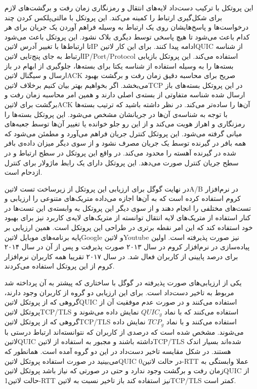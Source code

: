  این پروتکل با ترکیب دست‌داد لایه‌های انتقال و رمزنگاری زمان رفت و برگشت‌های لازم برای شکل‌گیری ارتباط را کمینه می‌کند.
 این پروتکل با مالتی‌پلکس کردن چند درخواست‌ها و پاسخ‌هایشان روی یک ارتباط به وسیله فراهم آوردن یک جریان برای هر کدام باعث می‌شود تا هیچ پاسخی توسط دیگری بلاک نشود.
 این پروتکل باعث می‌شود تا ارتباط‌ها با تغییر آدرس ‌لاتین{IP} ادامه پیدا کنند. برای این کار ‌لاتین{QUIC} از شناسه ارتباط به جای پنج‌تایی ‌لاتین{IP/Port/Protocol} استفاده می‌کند.
 این پروتکل بازیابی بسته‌ها را به وسیله استفاده از شناسه یکتا برای بسته‌ها، جلوگیری از ابهام در باز ارسال و سیگنال ‌لاتین{ACK} صریح برای محاسبه دقیق زمان رفت و برگشت بهبود می‌بخشد. اگر بخواهیم بهتر بیان کنیم برخلاف ‌لاتین{TCP} در این پروتکل
بسته‌های باز ارسال شده شناسه متفاوتی از بسته‌ی اصلی دارند و همین امر محاسبه زمان رفت و برگشت برای ‌لاتین{ACK} آن‌ها را ساده‌تر می‌کند. در نظر داشته باشید که ترتیب بسته‌ها با توجه به شناسه‌ی آن‌ها در جریانشان مشخص می‌شود.
 این پروتکل بسته‌ها را رمزنگاری و اهراز هویت می‌کند و از این رو جلو خوانده یا تغییر آن‌ها توسط جعبه‌های میانی گرفته می‌شود.
 این پروتکل کنترل جریان فراهم می‌آورد و مطمئن می‌شود که همه بافر در گیرنده توسط یک جریان مصرف نشود و از سوی دیگر میزان داده‌ی بافر شده در گیرنده آهسته را محدود می‌کند. در واقع این پروتکل در سطح ارتباط و در سطح جریان کنترل صورت می‌دهد.
 این پروتکل دارای یک رابط ماژولار برای کنترل ازدحام است.

در نهایت گوگل برای ارزیابی این پروتکل از زیرساخت تست ‌لاتین{A/B} در نرم‌افزار کروم استفاده کرده است که به آن‌ها اجازه می‌داده متریک‌های متنوعی را ارزیابی و تست‌های مختلفی را انجام دهند
و از سوی دیگر این پروتکل به وابسته‌ی این تست‌ها در کنار استفاده از متریک‌های لایه انتقال توانسته از متریک‌های لایه‌ی کاربرد نیز برای بهبود خود استفاده کند که این امر نقطه برتری در طراحی این پروتکل است.
همین ارزیابی بر پایه برنامه‌های موبایل ‌لاتین{Google} و ‌لاتین{Youtube} نیز صورت پذیرفته است.
اولین پیاده‌سازی در نرم‌افزار کروم در سال ۲۰۱۳ صورت پذیرفت و پس از آن در سال ۲۰۱۴ برای درصد پایینی از کاربران فعال شد. در سال ۲۰۱۷ تقریبا همه کاربران نرم‌افزار کروم از این پروتکل استفاده می‌کردند.

یکی از ارزیابی‌های صورت پذیرفته در گوگل با ساختاری که پیشتر به آن پرداخته شد مربوط به تاخیر دست‌داد است. برای این ارزیابی دو گروه از کاربران وجود دارند، گروهی که از پروتکل ‌لاتین{QUIC} استفاده می‌کنند
و در صورت عدم موفقیت آن از پروتکل ‌لاتین{TCP/TLS} استفاده می‌کنند که با نماد $QUIC_{g}$ نمایش داده می‌شوند و گروهی که از پروتکل ‌لاتین{TCP/TLS} استفاده می‌کنند و با نماد $TCP_{g}$
نمایش داده می‌شوند. مشخص شده است که درصدی از کاربران که نتوانسته‌اند ارتباط درستی با ‌لاتین{QUIC} داشته باشند و مجبور به استفاده از ‌لاتین{TCP/TLS} شده‌اند بسیار اندک هستند.
در شکل  مقایسه تاخیر دست‌داد در این دو گروه آمده است. همانطور که می‌بینید در صورت استفاده پروتکل ‌لاتین{QUIC} در حالت ‌لاتین{0-RTT}
عملا وابستگی به زمان رفت و برگشت وجود ندارد و حتی در صورتی که نیاز باشد پروتکل ‌لاتین{QUIC} از حالت ‌لاتین{1-RTT} نیز استفاده کند باز تاخیر نسبت به ‌لاتین{TCP/TLS} کمتر است.

